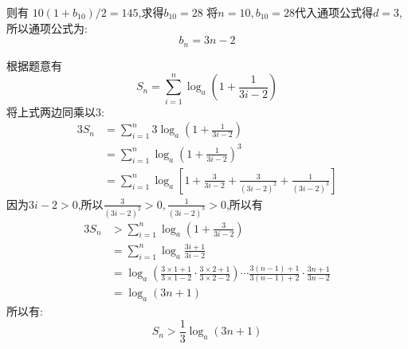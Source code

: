 \begin{questions}
\begin{solution}
\begin{penum}
			则有
			\begin{math}
				10(1+b_{10})/2=145
			\end{math},求得$b_{10}=28$
			将$n=10, b_{10}=28$代入通项公式得$d=3$,所以通项公式为:
			\begin{equation*}
				b_n = 3n - 2
			\end{equation*}
			\item 根据题意有
			\begin{equation*}
				S_n = \sum_{i=1}^n\log_a(1+\frac{1}{3i-2})
			\end{equation*}
			将上式两边同乘以$3$:
			\begin{align*}
				3S_n & = \sum_{i=1}^n3\log_a(1+\frac1{3i-2})                                        \\
				     & = \sum_{i=1}^n\log_a(1+\frac1{3i-2})^3                                       \\
				     & = \sum_{i=1}^n\log_a[1+\frac{3}{3i-2}+\frac{3}{(3i-2)^2} + \frac1{(3i-2)^3}]
			\end{align*}
			因为$3i-2>0$,所以$\frac3{(3i-2)^2} > 0, \frac1{(3i-2)^3}>0$,所以有
			\begin{align*}
				3S_n & > \sum_{i=1}^n\log_a(1+\frac3{3i-2})     \\
				     & = \sum_{i=1}^n\log_a\frac{3i+1}{3i-2}    \\
				     & = \log_a(\frac{3\times1 + 1}{3\times1-2}
				\cdot\frac{3\times2+1}{3\times2-2})
				\cdots
				\frac{3(n-1) +1}{3(n-1)+2}
				\cdot \frac{3n + 1}{3n-2}                       \\
				     & = \log_a(3n+1)
			\end{align*}
			所以有:
			\begin{equation*}
				S_n > \frac13\log_a(3n+1)
			\end{equation*}
		\end{penum}
	\end{solution}
\end{questions}

